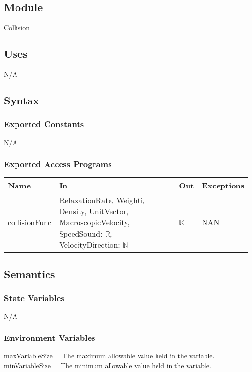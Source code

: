 \documentclass[12pt, titlepage]{article}
\begin{document}
\subsection{Module}

Collision

\subsection{Uses}
N/A

\subsection{Syntax}

\subsubsection{Exported Constants}
N/A

\subsubsection{Exported Access Programs}

\begin{center}
	\begin{tabular}{p{3cm} p{3cm} p{3cm} p{2cm}}
		\hline
		\textbf{Name} & \textbf{In} & \textbf{Out} & \textbf{Exceptions} \\
		\hline
		collisionFunc & RelaxationRate, Weighti, Density, UnitVector, MacroscopicVelocity, SpeedSound: $\mathbb{R}$, VelocityDirection: $\mathbb{N}$ & $\mathbb{R}$ & NAN \\
		\hline
	\end{tabular}
\end{center}

\subsection{Semantics}

\subsubsection{State Variables}
N/A

\subsubsection{Environment Variables}
maxVariableSize = The maximum allowable value held in the variable.\\
minVariableSize = The minimum allowable value held in the variable.
\end{document}
